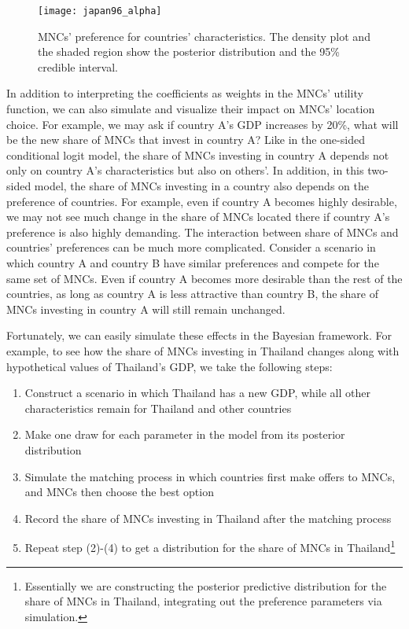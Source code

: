 \begin{figure}[tbp] \centering
  \texttt{[image: japan96\_alpha]}
  \caption[MNCs' preference for countries' characteristics.]{MNCs' preference
    for countries' characteristics. The density plot and the shaded region show
    the posterior distribution and the 95\% credible interval.}
  \label{fig:japan96_alpha}
\end{figure}

In addition to interpreting the coefficients as weights in the MNCs' utility
function, we can also simulate and visualize their impact on MNCs' location
choice. For example, we may ask if country A's GDP increases by 20\%, what will
be the new share of MNCs that invest in country A? Like in the one-sided
conditional logit model, the share of MNCs investing in country A depends not
only on country A's characteristics but also on others'. In addition, in this
two-sided model, the share of MNCs investing in a country also depends on the
preference of countries. For example, even if country A becomes highly
desirable, we may not see much change in the share of MNCs located there if
country A's preference is also highly demanding. The interaction between share
of MNCs and countries' preferences can be much more complicated. Consider a
scenario in which country A and country B have similar preferences and compete
for the same set of MNCs. Even if country A becomes more desirable than the rest
of the countries, as long as country A is less attractive than country B, the
share of MNCs investing in country A will still remain unchanged.

Fortunately, we can easily simulate these effects in the Bayesian framework. For
example, to see how the share of MNCs investing in Thailand changes along with
hypothetical values of Thailand's GDP, we take the following steps:

\begin{enumerate}
\item Construct a scenario in which Thailand has a new GDP, while all other
  characteristics remain for Thailand and other countries
\item Make one draw for each parameter in the model from its posterior
  distribution
\item Simulate the matching process in which countries first make offers to
  MNCs, and MNCs then choose the best option
\item Record the share of MNCs investing in Thailand after the matching process
\item Repeat step (2)-(4) to get a distribution for the share of MNCs in
  Thailand\footnote{Essentially we are constructing the posterior predictive
    distribution for the share of MNCs in Thailand, integrating out the
    preference parameters via simulation.}
\end{enumerate}

